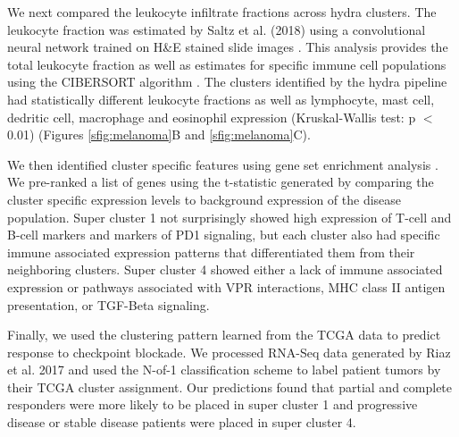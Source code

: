 \documentclass[fleqn,10pt]{wlscirep}
\begin{document}
We next compared the leukocyte infiltrate fractions across hydra clusters. The leukocyte fraction was estimated by Saltz et al. (2018) using a convolutional neural network trained on H\&E stained slide images \cite{saltz2018spatial}. This analysis provides the total leukocyte fraction as well as estimates for specific immune cell populations using the CIBERSORT algorithm \cite{newman2015robust}. The clusters identified by the hydra pipeline had statistically different leukocyte fractions as well as lymphocyte, mast cell, dedritic cell, macrophage and eosinophil expression (Kruskal-Wallis test: p $<$ 0.01) (Figures \ref{sfig:melanoma}B and \ref{sfig:melanoma}C).

We then identified cluster specific features using gene set enrichment analysis \cite{subramanian2005gene,mootha2003pgc,sergushichev2016algorithm}. We pre-ranked a list of genes using the t-statistic generated by comparing the cluster specific expression levels to background expression of the disease population. Super cluster 1 not surprisingly showed high expression of T-cell and B-cell markers and markers of PD1 signaling, but each cluster also had specific immune associated expression patterns that differentiated them from their neighboring clusters. Super cluster 4 showed either a lack of immune associated expression or pathways associated with VPR interactions, MHC class II antigen presentation, or TGF-Beta signaling. 

Finally, we used the clustering pattern learned from the TCGA data to predict response to checkpoint blockade. We processed RNA-Seq data generated by Riaz et al. 2017 and used the N-of-1 classification scheme to label patient tumors by their TCGA cluster assignment. Our predictions found that partial and complete responders were more likely to be placed in super cluster 1 and progressive disease or stable disease patients were placed in super cluster 4.

\end{document}
